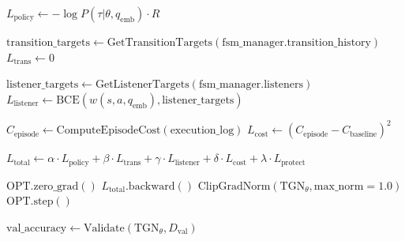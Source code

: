 \documentclass[11pt,a4paper]{article}
\begin{document}
\begin{algorithm}[H]
{{{            $L_{\text{policy}} \leftarrow -\log P(\tau | \theta, q_{\text{emb}}) \cdot R$ 
            
            $\text{transition\_targets} \leftarrow \text{GetTransitionTargets}(\text{fsm\_manager}.\text{transition\_history})$\;
            $L_{\text{trans}} \leftarrow 0$\;
            
            $\text{listener\_targets} \leftarrow \text{GetListenerTargets}(\text{fsm\_manager}.\text{listeners})$\;
            $L_{\text{listener}} \leftarrow \text{BCE}(w(s, a, q_{\text{emb}}), \text{listener\_targets})$ 
            
            $C_{\text{episode}} \leftarrow \text{ComputeEpisodeCost}(\text{execution\_log})$\;
            $L_{\text{cost}} \leftarrow (C_{\text{episode}} - C_{\text{baseline}})^2$ 
            
            
            $L_{\text{total}} \leftarrow \alpha \cdot L_{\text{policy}} + \beta \cdot L_{\text{trans}} + \gamma \cdot L_{\text{listener}} + \delta \cdot L_{\text{cost}} + \lambda \cdot L_{\text{protect}}$ 
            
            $\text{OPT}.\text{zero\_grad}()$\;
            $L_{\text{total}}.\text{backward}()$\;
            $\text{ClipGradNorm}(\text{TGN}_\theta, \text{max\_norm}=1.0)$\;
            $\text{OPT}.\text{step}()$\;
        }
    }
    
    $\text{val\_accuracy} \leftarrow \text{Validate}(\text{TGN}_\theta, D_{\text{val}})$ 
    
}

\end{algorithm}
\end{document}
